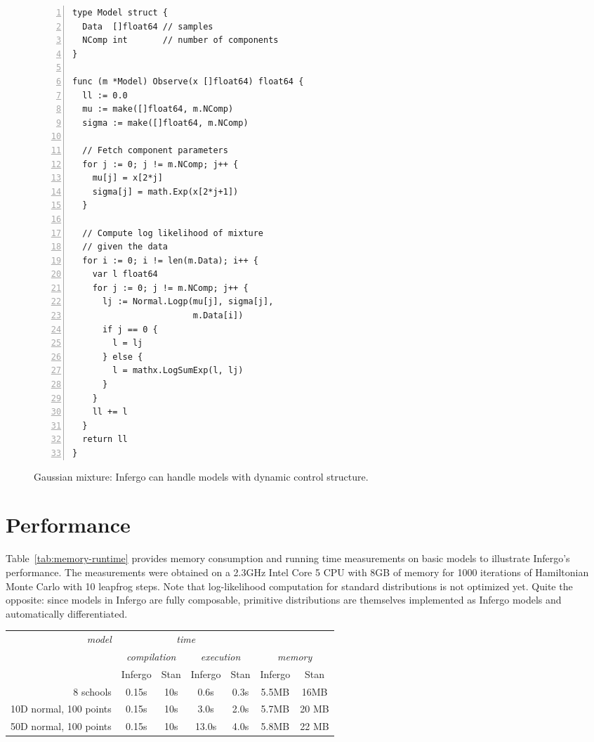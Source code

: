 \documentclass[sigplan,review,10pt,anonymous]{acmart}
\begin{document}
\begin{sloppypar}
\begin{figure}
\begin{lstlisting}[framexleftmargin=10pt,numbers=left]
type Model struct {
  Data  []float64 // samples
  NComp int       // number of components
}

func (m *Model) Observe(x []float64) float64 {
  ll := 0.0
  mu := make([]float64, m.NComp)
  sigma := make([]float64, m.NComp)

  // Fetch component parameters
  for j := 0; j != m.NComp; j++ {
    mu[j] = x[2*j]
    sigma[j] = math.Exp(x[2*j+1])
  }

  // Compute log likelihood of mixture
  // given the data
  for i := 0; i != len(m.Data); i++ {
    var l float64
    for j := 0; j != m.NComp; j++ {
      lj := Normal.Logp(mu[j], sigma[j],
                        m.Data[i])
      if j == 0 {
        l = lj
      } else {
        l = mathx.LogSumExp(l, lj)
      }
    }
    ll += l
  }
  return ll
}
\end{lstlisting}
\caption{Gaussian mixture: Infergo can handle models with
  dynamic control structure.}
\label{fig:gaussian-mixture}
\end{figure}

\section{Performance}

Table~\ref{tab:memory-runtime} provides memory consumption and
running time measurements on basic models to illustrate
Infergo's performance.  The measurements were obtained on a
2.3GHz Intel Core 5 CPU with 8GB of memory for 1000 iterations
of Hamiltonian Monte Carlo with 10 leapfrog steps. Note that
log-likelihood computation for standard distributions is not
optimized yet. Quite the opposite: since models in Infergo are
fully composable, primitive distributions are themselves
implemented as Infergo models and automatically differentiated.

\begin{table*}
\begin{tabular}{r | c |  c | c | c | c | c |}
	{\it model}  & \multicolumn{4}{c|}{\it time} & \multicolumn{2}{c|}{} \\
	& \multicolumn{2}{c|}{\it compilation} & \multicolumn{2}{c|}{\it execution} & \multicolumn{2}{c|}{\it memory} \\
	& Infergo & Stan & Infergo & Stan & Infergo & Stan \\\hline
	8 schools & 0.15s & 10s & 0.6s & 0.3s & 5.5MB & 16MB \\
	10D normal, 100 points & 0.15s & 10s & 3.0s & 2.0s & 5.7MB & 20 MB \\
	50D normal, 100 points & 0.15s & 10s & 13.0s & 4.0s & 5.8MB & 22 MB  
\end{tabular}
\caption{Memory and running times for 1000 iterations of HMC with 10 leapfrog steps.}
\label{tab:memory-runtime}
\end{table*}


\end{sloppypar}
\end{document}
